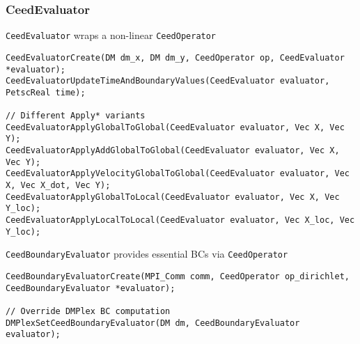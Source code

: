 \documentclass{beamer}
\begin{document}
\begin{frame}[fragile]
\begin{center}
\frametitle{CeedEvaluator}

\lstinline{CeedEvaluator} wraps a non-linear \lstinline{CeedOperator}

{\tiny
\begin{lstlisting}[style=boxedC]
CeedEvaluatorCreate(DM dm_x, DM dm_y, CeedOperator op, CeedEvaluator *evaluator);
CeedEvaluatorUpdateTimeAndBoundaryValues(CeedEvaluator evaluator, PetscReal time);

// Different Apply* variants
CeedEvaluatorApplyGlobalToGlobal(CeedEvaluator evaluator, Vec X, Vec Y);
CeedEvaluatorApplyAddGlobalToGlobal(CeedEvaluator evaluator, Vec X, Vec Y);
CeedEvaluatorApplyVelocityGlobalToGlobal(CeedEvaluator evaluator, Vec X, Vec X_dot, Vec Y);
CeedEvaluatorApplyGlobalToLocal(CeedEvaluator evaluator, Vec X, Vec Y_loc);
CeedEvaluatorApplyLocalToLocal(CeedEvaluator evaluator, Vec X_loc, Vec Y_loc);
\end{lstlisting}
}

\lstinline{CeedBoundaryEvaluator} provides essential BCs via \lstinline{CeedOperator}

{\tiny
\begin{lstlisting}[style=boxedC]
CeedBoundaryEvaluatorCreate(MPI_Comm comm, CeedOperator op_dirichlet, CeedBoundaryEvaluator *evaluator);

// Override DMPlex BC computation
DMPlexSetCeedBoundaryEvaluator(DM dm, CeedBoundaryEvaluator evaluator);
\end{lstlisting}
}

\end{center}
\end{frame}

\end{document}
